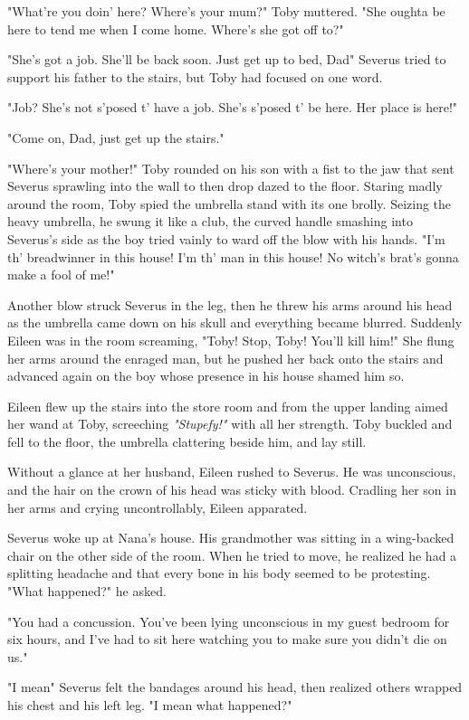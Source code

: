 "What're you doin' here? Where's your mum?" Toby muttered. "She oughta be here to tend me when I come home. Where's she got off to?"

"She's got a job. She'll be back soon. Just get up to bed, Dad{\el}" Severus tried to support his father to the stairs, but Toby had focused on one word.

"Job? She's not s'posed t' have a job. She's s'posed t' be here. Her place is here!"

"Come on, Dad, just get up the stairs."

"Where's your mother!" Toby rounded on his son with a fist to the jaw that sent Severus sprawling into the wall to then drop dazed to the floor. Staring madly around the room, Toby spied the umbrella stand with its one brolly. Seizing the heavy umbrella, he swung it like a club, the curved handle smashing into Severus's side as the boy tried vainly to ward off the blow with his hands. "I'm th' breadwinner in this house! I'm th' man in this house! No witch's brat's gonna make a fool of me!"

Another blow struck Severus in the leg, then he threw his arms around his head as the umbrella came down on his skull and everything became blurred. Suddenly Eileen was in the room screaming, "Toby! Stop, Toby! You'll kill him!" She flung her arms around the enraged man, but he pushed her back onto the stairs and advanced again on the boy whose presence in his house shamed him so.

Eileen flew up the stairs into the store room and from the upper landing aimed her wand at Toby, screeching \emph{"Stupefy!"} with all her strength. Toby buckled and fell to the floor, the umbrella clattering beside him, and lay still.

Without a glance at her husband, Eileen rushed to Severus. He was unconscious, and the hair on the crown of his head was sticky with blood. Cradling her son in her arms and crying uncontrollably, Eileen apparated.

Severus woke up at Nana's house. His grandmother was sitting in a wing-backed chair on the other side of the room. When he tried to move, he realized he had a splitting headache and that every bone in his body seemed to be protesting. "What happened?" he asked.

"You had a concussion. You've been lying unconscious in my guest bedroom for six hours, and I've had to sit here watching you to make sure you didn't die on us."

"I mean{\el}" Severus felt the bandages around his head, then realized others wrapped his chest and his left leg. "I mean what happened?"

